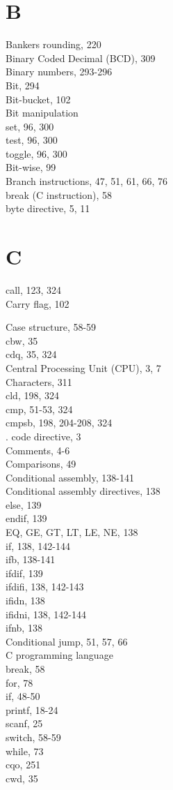 \documentclass[10pt]{article}
\begin{document}
\section*{B}
Bankers rounding, 220\\
Binary Coded Decimal (BCD), 309\\
Binary numbers, 293-296\\
Bit, 294\\
Bit-bucket, 102\\
Bit manipulation\\
set, 96, 300\\
test, 96, 300\\
toggle, 96, 300\\
Bit-wise, 99\\
Branch instructions, 47, 51, 61, 66, 76\\
break (C instruction), 58\\
byte directive, 5, 11

\section*{C}
call, 123, 324\\
Carry flag, 102

Case structure, 58-59\\
cbw, 35\\
cdq, 35, 324\\
Central Processing Unit (CPU), 3, 7\\
Characters, 311\\
cld, 198, 324\\
cmp, 51-53, 324\\
cmpsb, 198, 204-208, 324\\
. code directive, 3\\
Comments, 4-6\\
Comparisons, 49\\
Conditional assembly, 138-141\\
Conditional assembly directives, 138\\
else, 139\\
endif, 139\\
EQ, GE, GT, LT, LE, NE, 138\\
if, 138, 142-144\\
ifb, 138-141\\
ifdif, 139\\
ifdifi, 138, 142-143\\
ifidn, 138\\
ifidni, 138, 142-144\\
ifnb, 138\\
Conditional jump, 51, 57, 66\\
C programming language\\
break, 58\\
for, 78\\
if, 48-50\\
printf, 18-24\\
scanf, 25\\
switch, 58-59\\
while, 73\\
cqo, 251\\
cwd, 35
\end{document}
